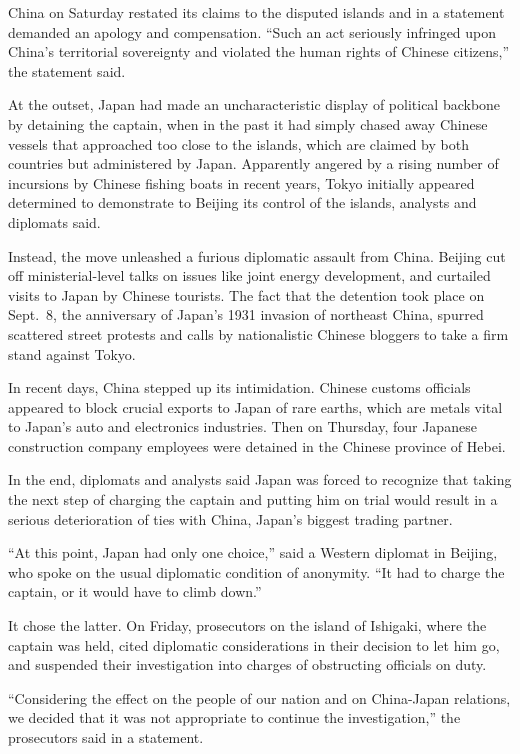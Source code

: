 ﻿\documentclass[12pt]{article}
\begin{document}
China on Saturday restated its claims to the disputed islands and in a statement demanded an apology
and compensation. ``Such an act seriously infringed upon China's territorial sovereignty and
violated the human rights of Chinese citizens,'' the statement said.

At the outset, Japan had made an uncharacteristic display of political backbone by detaining the
captain, when in the past it had simply chased away Chinese vessels that approached too close to the
islands, which are claimed by both countries but administered by Japan. Apparently angered by a
rising number of incursions by Chinese fishing boats in recent years, Tokyo initially appeared
determined to demonstrate to Beijing its control of the islands, analysts and diplomats said.

Instead, the move unleashed a furious diplomatic assault from China. Beijing cut off
ministerial-level talks on issues like joint energy development, and curtailed visits to Japan by
Chinese tourists. The fact that the detention took place on Sept.~8, the anniversary of Japan's 1931
invasion of northeast China, spurred scattered street protests and calls by nationalistic Chinese
bloggers to take a firm stand against Tokyo.

In recent days, China stepped up its intimidation. Chinese customs officials appeared to block
crucial exports to Japan of rare earths, which are metals vital to Japan's auto and electronics
industries. Then on Thursday, four Japanese construction company employees were detained in the
Chinese province of Hebei.

In the end, diplomats and analysts said Japan was forced to recognize that taking the next step of
charging the captain and putting him on trial would result in a serious deterioration of ties with
China, Japan's biggest trading partner.

``At this point, Japan had only one choice,'' said a Western diplomat in Beijing, who spoke on the
usual diplomatic condition of anonymity. ``It had to charge the captain, or it would have to climb
down.''

It chose the latter. On Friday, prosecutors on the island of Ishigaki, where the captain was held,
cited diplomatic considerations in their decision to let him go, and suspended their investigation
into charges of obstructing officials on duty.

``Considering the effect on the people of our nation and on China-Japan relations, we decided that
it was not appropriate to continue the investigation,'' the prosecutors said in a statement.
\end{document}
